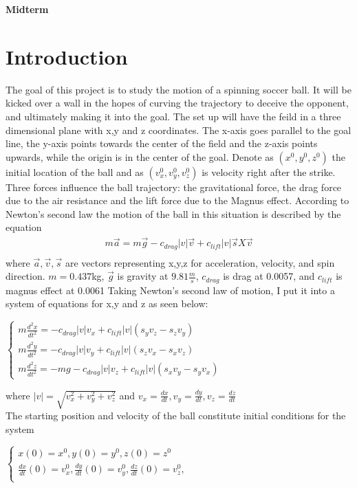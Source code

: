 \documentclass[12pt]{article}
\begin{document}
\centerline{\Large\textbf{Midterm}}
\vspace{2cm}

\section*{Introduction}\label{sec::Intro}
The goal of this project is to study the motion of a spinning soccer ball.  It will be kicked over a wall in the hopes of curving the trajectory to deceive the opponent, and ultimately making it into the goal.  The set up will have the feild in a three dimensional plane with x,y and z coordinates.  The x-axis goes parallel to the goal line, the y-axis points towards the center of the field and the z-axis points upwards, while the origin is in the center of the goal.  Denote as $(x^0, y^0, z^0)$ the initial  location of the ball and as $(v_x^0,v_y^0,v_z^0)$ is velocity right after the strike.  Three forces influence the ball trajectory: the gravitational force, the drag force due to the air resistance and the lift force due to the Magnus effect. According to Newton’s second law the motion of the ball in this situation is described by the equation
 \begin{eqnarray}
m\overrightarrow{a} = m\overrightarrow{g} - c_{drag}|v|\overrightarrow{v} + c_{lift}|v|\overrightarrow{s}X\overrightarrow{v}\\\nonumber
       \end{eqnarray}
where $\overrightarrow{a},\overrightarrow{v},\overrightarrow{s}$ are vectors representing x,y,z for acceleration, velocity, and spin direction.  $m = 0.437$kg, $\overrightarrow{g}$ is gravity at $9.81\frac{m}{s}$, $c_{drag}$ is drag at 0.0057, and $c_{lift}$ is magnus effect at 0.0061
Taking Newton's second  law of motion, I put it into a system of equations for x,y and z as seen below:
\begin{center}
$\begin{cases} 
m\frac{d^2x}{dt^2} = -c_{drag}|v|v_x+c_{lift}|v|(s_yv_z-s_zv_y)  \\
m\frac{d^2y}{dt^2} =-c_{drag}|v|v_y+c_{lift}|v|(s_zv_x-s_xv_z)\\ 
m\frac{d^2z}{dt^2} = -mg-c_{drag}|v|v_z+c_{lift}|v|(s_xv_y-s_yv_x)
 \end{cases}$
\end{center}
where $|v| = \sqrt{v_x^2+v_y^2+v_z^2}$ and $v_x = \frac{dx}{dt},v_y = \frac{dy}{dt},v_z= \frac{dz}{dt}$\\
The starting position and velocity of the ball constitute initial conditions for the system
\begin{center}
$\begin{cases}
x(0) = x^0, y(0) = y^0, z(0) = z^0 \\
\frac{dx}{dt}(0) =v_x^0,\frac{dy}{dt}(0) = v_y^0,\frac{dz}{dt}(0) = v_z^0,\\
 \end{cases}$
\end{center}
\end{document}
